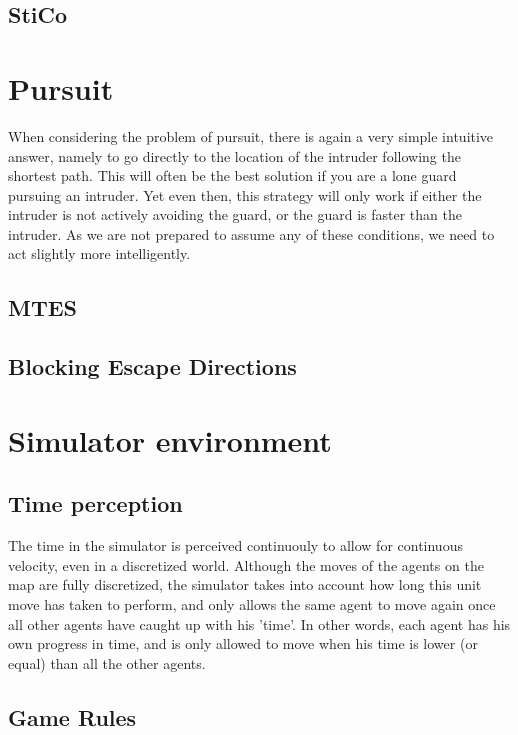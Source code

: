 \documentclass{apa6}
\begin{document}
		\subsection{StiCo}
			

	\section{Pursuit}
		When considering the problem of pursuit, there is again a very simple intuitive answer, namely to go directly to the location of the intruder following the shortest path. This will often be the best solution if you are a lone guard pursuing an intruder. Yet even then, this strategy will only work if either the intruder is not actively avoiding the guard, or the guard is faster than the intruder. As we are not prepared to assume any of these conditions, we need to act slightly more intelligently.

	    \subsection{MTES}
			

		\subsection{Blocking Escape Directions}
			

	\section{Simulator environment}
		\subsection{Time perception}
			The time in the simulator is perceived continuouly to allow for continuous velocity, even in a discretized world. Although the moves of the agents on the map are fully discretized, the simulator takes into account how long this unit move has taken to perform, and only allows the same agent to move again once all other agents have caught up with his 'time'. In other words, each agent has his own progress in time, and is only allowed to move when his time is lower (or equal) than all the other agents.
		\subsection{Game Rules}
\end{document}
